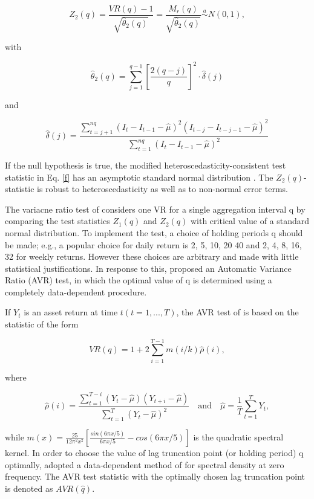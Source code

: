 \documentclass[AEJ,reqno, draftmode]{AEA}
\begin{document}
\begin{equation} \label{f}
    Z_2(q) = \frac{VR(q)-1}{\sqrt{\hat{\theta}_2(q)}} =  \frac{M_r(q)}{\sqrt{\hat{\theta}_2(q)}} \stackrel{a}{\sim} N(0,1) ,
\end{equation}

with

$$ \hat{\theta}_2(q) = \sum_{j=1}^{q-1}\left[\frac{2(q-j)}{q}\right]^2 \cdot \hat{\delta}(j) $$

and

$$ \hat{\delta}(j) = \frac{\sum\limits_{t=j+1}^{nq}(I_t-I_{t-1}-\hat{\mu})^2(I_{t-j}-I_{t-j-1}-\hat{\mu})^2}{\sum\limits_{t=1}^{nq}(I_t-I_{t-1}-\hat{\mu})^2}  $$

If the null hypothesis is true, the modified heteroscedasticity-consistent test statistic in Eq. \eqref{f} has an asymptotic standard normal distribution \citep{liu1991variance}. The $Z_2(q)$-statistic is robust to heteroscedasticity as well as to non-normal error terms. 

The variacne ratio test of \citet{lo1988stock} considers one VR for a single aggregation interval q by comparing the test statistics $Z_1(q)$ and $Z_2(q)$ with critical value of a standard normal distribution. To implement the test, a choice of holding periods q should be made; e.g., a popular choice for daily return is 2, 5, 10, 20 40 and 2, 4, 8, 16, 32 for weekly returns. However these choices are arbitrary and made with little statistical justifications. In response to this, \citet{choi1999testing} proposed an Automatic Variance Ratio (AVR) test, in which the optimal value of q is determined using a completely data-dependent procedure. 

If $Y_t$ is an asset return at time $t(t = 1,...,T)$, the AVR test of \citet{choi1999testing} is based on the statistic of the form


\begin{equation} \label{g}
    VR(q) = 1 + 2\sum_{i=1}^{T-1}m(i/k)\hat{\rho}(i),
\end{equation}

where 

$$ \hat{\rho}(i) = \frac{\sum\limits_{t=1}^{T-i}(Y_t-\hat{\mu})(Y_{t+i}-\hat{\mu})}{\sum\limits_{t=1}^{T}(Y_t-\hat{\mu})^2} \quad \textrm{and} \quad \hat{\mu} = \frac{1}{T}\sum_{t=1}^{T}Y_t, $$

while $m(x) = \frac{25}{12\pi^2x^2}\left[\frac{sin(6\pi x/5)}{6\pi x/5}-cos(6\pi x/5)\right]$ is the quadratic spectral kernel. In order to choose the value of lag truncation point (or holding period) q optimally, \citet{choi1999testing} adopted a data-dependent method of \citet{andrews1991heteroskedasticity} for spectral density at zero frequency. The AVR test statistic with the optimally chosen lag truncation point is denoted as $AVR(\hat{q})$. 
\end{document}
